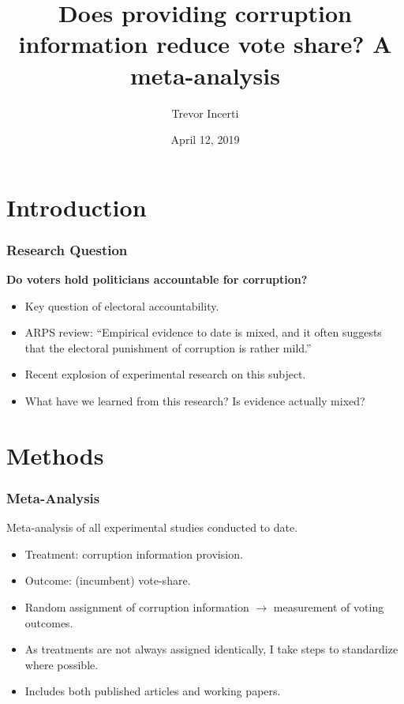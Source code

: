 \documentclass[usenames,dvipsnames]{beamer}
\title{Does providing corruption information reduce vote share? A meta-analysis}
\date{April 12, 2019}
\author{Trevor Incerti}
\begin{document}
\maketitle


\section{Introduction}

\begin{frame}
\frametitle{Research Question}
\textbf{Do voters hold politicians accountable for corruption?}
\pause
\begin{itemize}
\item Key question of \textcolor{Cerulean}{electoral accountability}. 
\pause
\item ARPS review: ``Empirical evidence to date is \textcolor{Cerulean}{mixed}, and it often suggests that the electoral punishment of corruption is rather mild.'' \citep{de2017electoral} 
\pause
\item Recent explosion of experimental research on this subject. 
\pause
\item What have we learned from this research? Is evidence actually mixed?
\end{itemize}
\end{frame}


\section{Methods}

\begin{frame}
\frametitle{Meta-Analysis}
Meta-analysis of all \textcolor{Cerulean}{experimental} studies conducted to date. 
\pause
\begin{itemize}
\item \textcolor{Cerulean}{Treatment}: corruption information provision. 
\pause
\item \textcolor{Cerulean}{Outcome}: (incumbent) vote-share.
\pause
\item Random assignment of corruption information $\rightarrow$ measurement of voting outcomes.
\pause
\item As treatments are not always assigned identically, I take steps to standardize where possible. \hyperlink{details}{}
\pause
\item Includes both \textcolor{Cerulean}{published articles and working papers}.
\end{itemize}
\end{frame}
\end{document}

